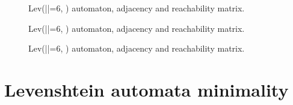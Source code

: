 \documentclass[sigplan,review,acmsmall,nonacm,screen,anonymous]{acmart}\settopmatter{printfolios=false,printccs=false,printacmref=false}
\begin{document}
\begin{figure}[H]
\begin{center}
\end{center}
\caption{Lev(|\sigma|=6, ) automaton, adjacency and reachability matrix.}
\end{figure}

\begin{figure}[H]
\begin{center}
\end{center}
\caption{Lev(|\sigma|=6, ) automaton, adjacency and reachability matrix.}
\end{figure}

\begin{figure}[H]
\begin{center}
\end{center}
\caption{Lev(|\sigma|=6, ) automaton, adjacency and reachability matrix.}
\end{figure}

\section{Levenshtein automata minimality}
\end{document}
